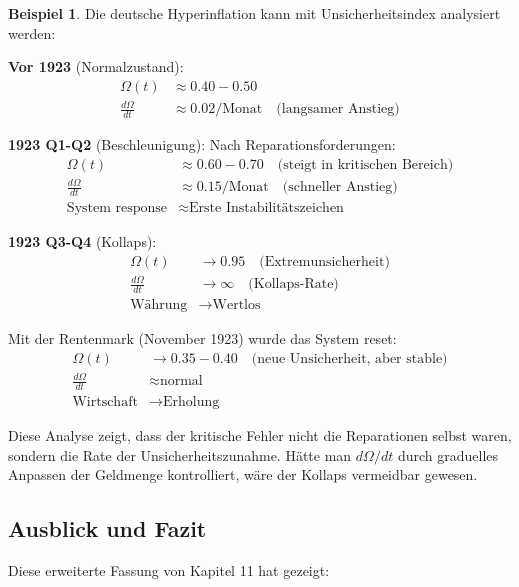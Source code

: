\documentclass[a4paper, 12pt, twoside, openright]{report}
\theoremstyle{definition}
\theoremstyle{definition}
\newtheorem{beispiel}{Beispiel}[chapter]
\begin{document}
\begin{beispiel}

Die deutsche Hyperinflation kann mit Unsicherheitsindex analysiert werden:

\textbf{Vor 1923} (Normalzustand):
\begin{align}
\Omega(t) &\approx 0.40-0.50 \\
\frac{d\Omega}{dt} &\approx 0.02/\text{Monat} \quad \text{(langsamer Anstieg)}
\end{align}

\textbf{1923 Q1-Q2} (Beschleunigung):
Nach Reparationsforderungen:
\begin{align}
\Omega(t) &\approx 0.60-0.70 \quad \text{(steigt in kritischen Bereich)} \\
\frac{d\Omega}{dt} &\approx 0.15/\text{Monat} \quad \text{(schneller Anstieg)} \\
\text{System response} &\approx \text{Erste Instabilitätszeichen}
\end{align}

\textbf{1923 Q3-Q4} (Kollaps):
\begin{align}
\Omega(t) &\to 0.95 \quad \text{(Extremunsicherheit)} \\
\frac{d\Omega}{dt} &\to \infty \quad \text{(Kollaps-Rate)} \\
\text{Währung} &\to \text{Wertlos}
\end{align}

Mit der Rentenmark (November 1923) wurde das System reset:
\begin{align}
\Omega(t) &\to 0.35-0.40 \quad \text{(neue Unsicherheit, aber stable)} \\
\frac{d\Omega}{dt} &\approx \text{normal} \\
\text{Wirtschaft} &\to \text{Erholung}
\end{align}

Diese Analyse zeigt, dass der kritische Fehler nicht die Reparationen selbst waren, sondern die Rate der Unsicherheitszunahme. Hätte man $d\Omega/dt$ durch graduelles Anpassen der Geldmenge kontrolliert, wäre der Kollaps vermeidbar gewesen.

\end{beispiel}

\subsection{Ausblick und Fazit}

Diese erweiterte Fassung von Kapitel 11 hat gezeigt:
\end{document}
